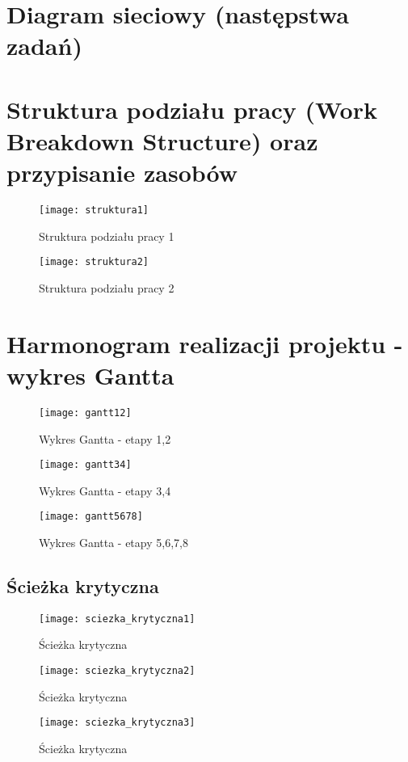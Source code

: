\chapter{Diagram sieciowy (następstwa zadań)}
\chapter{Struktura podziału pracy (Work Breakdown Structure) oraz przypisanie zasobów}
\begin{figure}[H]
\centering
  \texttt{[image: struktura1]}
  \caption{Struktura podziału pracy 1}
  \label{struktura1}
\end{figure}
\begin{figure}[H]
\centering
  \texttt{[image: struktura2]}
  \caption{Struktura podziału pracy 2}
  \label{struktura2}
\end{figure}
\chapter{Harmonogram realizacji projektu -  wykres Gantta}
\begin{figure}[H]
\centering
  \texttt{[image: gantt12]}
  \caption{Wykres Gantta - etapy 1,2}
  \label{gantt12}
\end{figure}
\begin{figure}[H]
\centering
  \texttt{[image: gantt34]}
  \caption{Wykres Gantta - etapy 3,4}
  \label{gantt34}
\end{figure}
\begin{figure}[H]
\centering
  \texttt{[image: gantt5678]}
  \caption{Wykres Gantta - etapy 5,6,7,8}
  \label{gantt5678}
\end{figure}
\section{Ścieżka krytyczna}
\begin{figure}[H]
\centering
  \texttt{[image: sciezka\_krytyczna1]}
  \caption{Ścieżka krytyczna}
  \label{sciezka_krytyczna1}
\end{figure}
\begin{figure}[H]
\centering
  \texttt{[image: sciezka\_krytyczna2]}
  \caption{Ścieżka krytyczna}
  \label{sciezka_krytyczna2}
\end{figure}
\begin{figure}[H]
\centering
  \texttt{[image: sciezka\_krytyczna3]}
  \caption{Ścieżka krytyczna}
  \label{sciezka_krytyczna3}
\end{figure}
